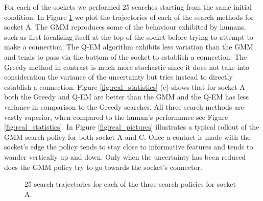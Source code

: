 For each of the sockets we performed 25 searches starting from the same initial condition. In Figure \ref{fig:real_policy} we plot
the trajectories of each of the search methods for socket A. The GMM reproduces some of the behaviour exhibited by humans, such as 
first localising itself at the top of the socket before trying to attempt to make a connection. The Q-EM algorithm exhibits less variation
than the GMM and tends to pass via the bottom of the socket to establish a connection. The Greedy method in contrast is much more  
stochastic since it does not take into consideration the variance of the uncertainty but tries instead to directly establish a connection.
Figure \ref{fig:real_statistics} (c) shows that for socket A both the Greedy and Q-EM are better than the GMM and the Q-EM has less
variance in comparison to the Greedy searches.  All three search methods are vastly superior, when compared to the human's performance 
see Figure \ref{fig:real_statistics}.  In Figure \ref{fig:real_pictures} illustrates a typical rollout of the GMM search policy for both 
socket A and C. Once a contact is made with the socket's edge the policy tends to stay close to informative features and tends to 
wander vertically up and down. Only when the uncertainty has been reduced does the GMM policy try to go towards the socket's connector. 

\begin{figure}
 \centering
    \caption{%
    25 search trajectories for each of the three search policies for socket A. }
    \label{fig:real_policy}
\end{figure}


